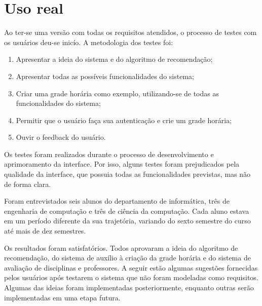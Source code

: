\chapter{Uso real}
\label{cha:Uso real}

Ao ter-se uma versão com todas os requisitos atendidos, o processo de testes com os usuários deu-se inicío. A metodologia dos testes foi:

\begin{enumerate}
    \item Apresentar a ideia do sistema e do algoritmo de recomendação;
    \item Apresentar todas as possíveis funcionalidades do sistema;
    \item Criar uma grade horária como exemplo, utilizando-se de todas as funcionalidades do sistema;
    \item Permitir que o usuário faça sua autenticação e crie um grade horária;
    \item Ouvir o feedback do usuário.
\end{enumerate}

Os testes foram realizados durante o processo de desenvolvimento e aprimoramento da interface. Por isso, alguns testes foram prejudicados pela qualidade da interface, que possuia todas as funcionalidades previstas, mas não de forma clara.

Foram entrevistados seis alunos do departamento de informática, três de engenharia de computação e três de ciência da computação. Cada aluno estava em um período diferente da sua trajetória, variando do sexto semestre do curso até mais de dez semestres.

Os resultados foram satisfatórios. Todos aprovaram a ideia do algoritmo de recomendação, do sistema de auxílio à criação da grade horária e do sistema de avaliação de disciplinas e professores. A seguir estão algumas sugestões fornecidas pelos usuários após testarem o sistema que não foram modeladas como requisitos. Algumas das ideias foram implementadas posteriormente, enquanto outras serão implementadas em uma etapa futura.

